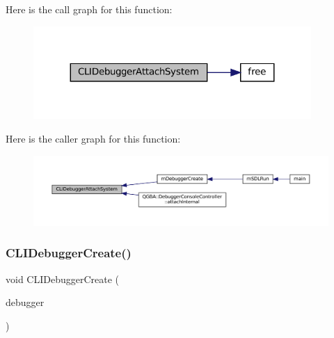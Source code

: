 Here is the call graph for this function\+:
\nopagebreak
\begin{figure}[H]
\begin{center}
\leavevmode
\includegraphics[width=299pt]{debugger_2cli-debugger_8c_a9b5442362cea68ef05c1568aba4a0716_cgraph}
\end{center}
\end{figure}
Here is the caller graph for this function\+:
\nopagebreak
\begin{figure}[H]
\begin{center}
\leavevmode
\includegraphics[width=350pt]{debugger_2cli-debugger_8c_a9b5442362cea68ef05c1568aba4a0716_icgraph}
\end{center}
\end{figure}
\mbox{\label{debugger_2cli-debugger_8c_a26b35228e120f0d18563af7b57826e30}} 
\subsubsection{\texorpdfstring{C\+L\+I\+Debugger\+Create()}{CLIDebuggerCreate()}}
{\footnotesize\ttfamily void C\+L\+I\+Debugger\+Create (\begin{DoxyParamCaption}\item[{struct C\+L\+I\+Debugger $\ast$}]{debugger }\end{DoxyParamCaption})}


